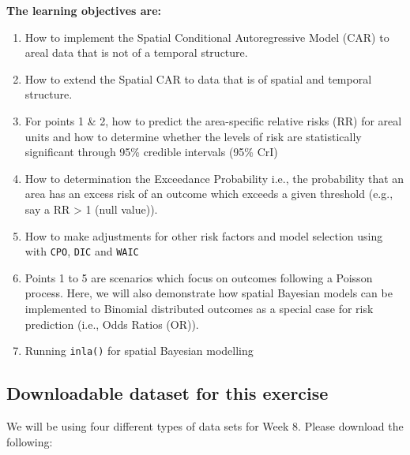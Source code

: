 \documentclass[
]{book}
\begin{document}
\textbf{The learning objectives are:}

\begin{enumerate}
\def\labelenumi{\arabic{enumi}.}
\item
  How to implement the Spatial Conditional Autoregressive Model (CAR) to areal data that is not of a temporal structure.
\item
  How to extend the Spatial CAR to data that is of spatial and temporal structure.
\item
  For points 1 \& 2, how to predict the area-specific relative risks (RR) for areal units and how to determine whether the levels of risk are statistically significant through 95\% credible intervals (95\% CrI)
\item
  How to determination the Exceedance Probability i.e., the probability that an area has an excess risk of an outcome which exceeds a given threshold (e.g., say a RR \textgreater{} 1 (null value)).
\item
  How to make adjustments for other risk factors and model selection using with \texttt{CPO}, \texttt{DIC} and \texttt{WAIC}
\item
  Points 1 to 5 are scenarios which focus on outcomes following a Poisson process. Here, we will also demonstrate how spatial Bayesian models can be implemented to Binomial distributed outcomes as a special case for risk prediction (i.e., Odds Ratios (OR)).
\item
  Running \texttt{inla()} for spatial Bayesian modelling
\end{enumerate}

\hypertarget{downloadable-dataset-for-this-exercise-3}{%
\subsection{Downloadable dataset for this exercise}\label{downloadable-dataset-for-this-exercise-3}}

We will be using four different types of data sets for Week 8. Please download the following:
\end{document}
